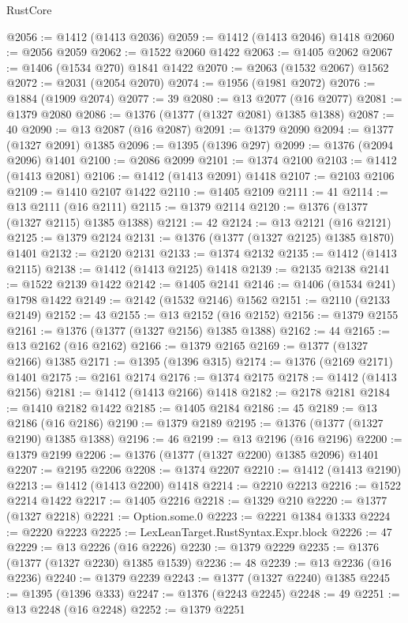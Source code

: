\begin{lexlean}{RustCore}
\begin{coremodule}
@2056 := @1412 (@1413 @2036)
@2059 := @1412 (@1413 @2046) @1418
@2060 := @2056 @2059
@2062 := @1522 @2060 @1422
@2063 := @1405 @2062
@2067 := @1406 (@1534 @270) @1841 @1422
@2070 := @2063 (@1532 @2067) @1562
@2072 := @2031 (@2054 @2070)
@2074 := @1956 (@1981 @2072)
@2076 := @1884 (@1909 @2074)
@2077 := 39
@2080 := @13 @2077 (@16 @2077)
@2081 := @1379 @2080
@2086 := @1376 (@1377 (@1327 @2081) @1385 @1388)
@2087 := 40
@2090 := @13 @2087 (@16 @2087)
@2091 := @1379 @2090
@2094 := @1377 (@1327 @2091) @1385
@2096 := @1395 (@1396 @297)
@2099 := @1376 (@2094 @2096) @1401
@2100 := @2086 @2099
@2101 := @1374 @2100
@2103 := @1412 (@1413 @2081)
@2106 := @1412 (@1413 @2091) @1418
@2107 := @2103 @2106
@2109 := @1410 @2107 @1422
@2110 := @1405 @2109
@2111 := 41
@2114 := @13 @2111 (@16 @2111)
@2115 := @1379 @2114
@2120 := @1376 (@1377 (@1327 @2115) @1385 @1388)
@2121 := 42
@2124 := @13 @2121 (@16 @2121)
@2125 := @1379 @2124
@2131 := @1376 (@1377 (@1327 @2125) @1385 @1870) @1401
@2132 := @2120 @2131
@2133 := @1374 @2132
@2135 := @1412 (@1413 @2115)
@2138 := @1412 (@1413 @2125) @1418
@2139 := @2135 @2138
@2141 := @1522 @2139 @1422
@2142 := @1405 @2141
@2146 := @1406 (@1534 @241) @1798 @1422
@2149 := @2142 (@1532 @2146) @1562
@2151 := @2110 (@2133 @2149)
@2152 := 43
@2155 := @13 @2152 (@16 @2152)
@2156 := @1379 @2155
@2161 := @1376 (@1377 (@1327 @2156) @1385 @1388)
@2162 := 44
@2165 := @13 @2162 (@16 @2162)
@2166 := @1379 @2165
@2169 := @1377 (@1327 @2166) @1385
@2171 := @1395 (@1396 @315)
@2174 := @1376 (@2169 @2171) @1401
@2175 := @2161 @2174
@2176 := @1374 @2175
@2178 := @1412 (@1413 @2156)
@2181 := @1412 (@1413 @2166) @1418
@2182 := @2178 @2181
@2184 := @1410 @2182 @1422
@2185 := @1405 @2184
@2186 := 45
@2189 := @13 @2186 (@16 @2186)
@2190 := @1379 @2189
@2195 := @1376 (@1377 (@1327 @2190) @1385 @1388)
@2196 := 46
@2199 := @13 @2196 (@16 @2196)
@2200 := @1379 @2199
@2206 := @1376 (@1377 (@1327 @2200) @1385 @2096) @1401
@2207 := @2195 @2206
@2208 := @1374 @2207
@2210 := @1412 (@1413 @2190)
@2213 := @1412 (@1413 @2200) @1418
@2214 := @2210 @2213
@2216 := @1522 @2214 @1422
@2217 := @1405 @2216
@2218 := @1329 @210
@2220 := @1377 (@1327 @2218)
@2221 := Option.some.{0}
@2223 := @2221 @1384 @1333
@2224 := @2220 @2223
@2225 := LexLeanTarget.RustSyntax.Expr.block
@2226 := 47
@2229 := @13 @2226 (@16 @2226)
@2230 := @1379 @2229
@2235 := @1376 (@1377 (@1327 @2230) @1385 @1539)
@2236 := 48
@2239 := @13 @2236 (@16 @2236)
@2240 := @1379 @2239
@2243 := @1377 (@1327 @2240) @1385
@2245 := @1395 (@1396 @333)
@2247 := @1376 (@2243 @2245)
@2248 := 49
@2251 := @13 @2248 (@16 @2248)
@2252 := @1379 @2251

\end{coremodule}
\end{lexlean}
